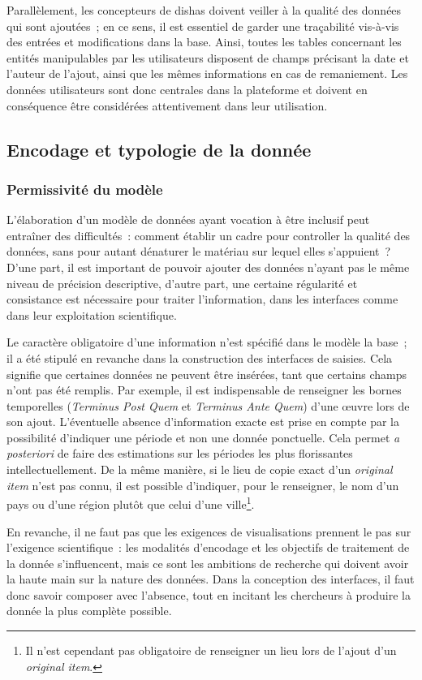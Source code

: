 \documentclass[a4paper,12pt,twoside]{book}
\newcommand{\eng}{\emph}
\newcommand{\oi}{\eng{original item}\xspace}
\newcommand{\dishas}{\gls{dishas}\xspace}
\begin{document}
Parallèlement, les concepteurs de \dishas doivent veiller à la qualité des données qui sont ajoutées~; en ce sens, il est essentiel de garder une traçabilité vis-à-vis des entrées et modifications dans la base. Ainsi, toutes les tables concernant les entités manipulables par les utilisateurs disposent de champs précisant la date et l'auteur de l'ajout, ainsi que les mêmes informations en cas de remaniement. Les données utilisateurs sont donc centrales dans la plateforme et doivent en conséquence être considérées attentivement dans leur utilisation.

		\subsection{Encodage et typologie de la donnée}
			\subsubsection{Permissivité du modèle}
L'élaboration d'un modèle de données ayant vocation à être inclusif peut entraîner des difficultés~: comment établir un cadre pour controller la qualité des données, sans pour autant dénaturer le matériau sur lequel elles s'appuient~? D'une part, il est important de pouvoir ajouter des données n'ayant pas le même niveau de précision descriptive, d'autre part, une certaine régularité et consistance est nécessaire pour traiter l'information, dans les interfaces comme dans leur exploitation scientifique.

Le caractère obligatoire d'une information n'est spécifié dans le modèle la base~; il a été stipulé en revanche dans la construction des interfaces de saisies. Cela signifie que certaines données ne peuvent être insérées, tant que certains champs n'ont pas été remplis. Par exemple, il est indispensable de renseigner les bornes temporelles (\eng{Terminus Post Quem} et \eng{Terminus Ante Quem}) d'une œuvre lors de son ajout. L'éventuelle absence d'information exacte est prise en compte par la possibilité d'indiquer une période et non une donnée ponctuelle. Cela permet \eng{a posteriori} de faire des estimations sur les périodes les plus florissantes intellectuellement. De la même manière, si le lieu de copie exact d'un \oi n'est pas connu, il est possible d'indiquer, pour le renseigner, le nom d'un pays ou d'une région plutôt que celui d'une ville\footnote{Il n'est cependant pas obligatoire de renseigner un lieu lors de l'ajout d'un \oi.}.

En revanche, il ne faut pas que les exigences de visualisations prennent le pas sur l'exigence scientifique~: les modalités d'encodage et les objectifs de traitement de la donnée s'influencent, mais ce sont les ambitions de recherche qui doivent avoir la haute main sur la nature des données. Dans la conception des interfaces, il faut donc savoir composer avec l'absence, tout en incitant les chercheurs à produire la donnée la plus complète possible.
\end{document}
